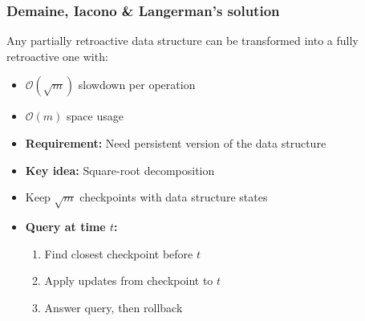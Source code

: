 \documentclass[fleqn]{beamer}
\newcommand{\Oh}{\mathcal{O}}
\begin{document}
\begin{frame}
    \frametitle{Demaine, Iacono \& Langerman's solution}
    
    \begin{theorem}[Theorem 05]
        Any partially retroactive data structure can be transformed into a fully retroactive one with:
        \begin{itemize}
        \item $\Oh(\sqrt{m})$ slowdown per operation
        \item $\Oh(m)$ space usage
        \item \textbf{Requirement:} Need persistent version of the data structure
        \end{itemize}
    \end{theorem} \pause
    
    \begin{itemize}
    \item \textbf{Key idea:} Square-root decomposition \vfill
    \item Keep $\sqrt{m}$ checkpoints with data structure states \vfill\pause
    \item \textbf{Query at time $t$:}
        \begin{enumerate}
        \item Find closest checkpoint before $t$
        \item Apply updates from checkpoint to $t$
        \item Answer query, then rollback
        \end{enumerate} \vfill
    \end{itemize}
\end{frame}
\end{document}
